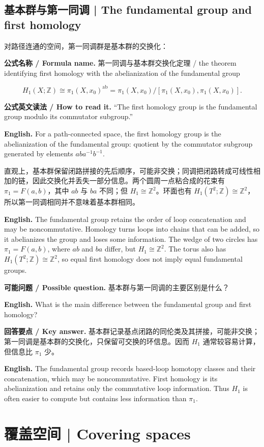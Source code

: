 \documentclass[UTF8,11pt,a4paper]{ctexart}
\newcommand{\EN}[1]{\par\noindent\textbf{English.} #1\par}
\newcommand{\READ}[1]{\par\noindent\textbf{公式英文读法 / How to read it.} #1\par}
\newcommand{\FORMULA}[2]{\par\noindent\textbf{公式名称 / Formula name.} #1 / #2\par}
\newcommand{\ASK}[4]{\par\noindent\textbf{可能问题 / Possible question.} #1\par\EN{#2}\noindent\textbf{回答要点 / Key answer.} #3\par\EN{#4}\medskip}
\begin{document}
\subsection{基本群与第一同调 | The fundamental group and first homology}
\noindent 对路径连通的空间，第一同调群是基本群的交换化：
\FORMULA{第一同调与基本群交换化定理}{the theorem identifying first homology with the abelianization of the fundamental group}
\[
H_1(X;\mathbb Z)\cong\pi_1(X,x_0)^{\mathrm{ab}}
=\pi_1(X,x_0)/[\pi_1(X,x_0),\pi_1(X,x_0)].
\]
\READ{“The first homology group is the fundamental group modulo its commutator subgroup.”}
\EN{For a path-connected space, the first homology group is the abelianization of the fundamental group: quotient by the commutator subgroup generated by elements $aba^{-1}b^{-1}$.}
\noindent 直观上，基本群保留闭路拼接的先后顺序，可能非交换；同调把闭路转成可线性相加的链，因此交换化并丢失一部分信息。两个圆周一点粘合成的花束有 $\pi_1=F(a,b)$，其中 $ab$ 与 $ba$ 不同；但 $H_1\cong\mathbb Z^2$。环面也有 $H_1(T^2;\mathbb Z)\cong\mathbb Z^2$，所以第一同调相同并不意味着基本群相同。
\EN{The fundamental group retains the order of loop concatenation and may be noncommutative. Homology turns loops into chains that can be added, so it abelianizes the group and loses some information. The wedge of two circles has $\pi_1=F(a,b)$, where $ab$ and $ba$ differ, but $H_1\cong\mathbb Z^2$. The torus also has $H_1(T^2;\mathbb Z)\cong\mathbb Z^2$, so equal first homology does not imply equal fundamental groups.}
\ASK{基本群与第一同调的主要区别是什么？}{What is the main difference between the fundamental group and first homology?}{基本群记录基点闭路的同伦类及其拼接，可能非交换；第一同调是基本群的交换化，只保留可交换的环信息。因而 $H_1$ 通常较容易计算，但信息比 $\pi_1$ 少。}{The fundamental group records based-loop homotopy classes and their concatenation, which may be noncommutative. First homology is its abelianization and retains only the commutative loop information. Thus $H_1$ is often easier to compute but contains less information than $\pi_1$.}

\section{覆盖空间 | Covering spaces}
\end{document}
